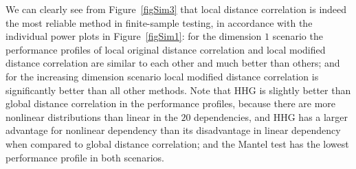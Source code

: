 \documentclass[12pt]{article}
\begin{document}
We can clearly see from Figure~\ref{figSim3} that local distance correlation is indeed the most reliable method in finite-sample testing, in accordance with the individual power plots in Figure~\ref{figSim1}: for the dimension $1$ scenario the performance profiles of local original distance correlation and local modified distance correlation are similar to each other and much better than others; and for the increasing dimension scenario local modified distance correlation is significantly better than all other methods. Note that HHG is slightly better than global distance correlation in the performance profiles, because there are more nonlinear distributions than linear in the $20$ dependencies, and HHG has a larger advantage for nonlinear dependency than its disadvantage in linear dependency when compared to global distance correlation; and the Mantel test has the lowest performance profile in both scenarios.
\end{document}
